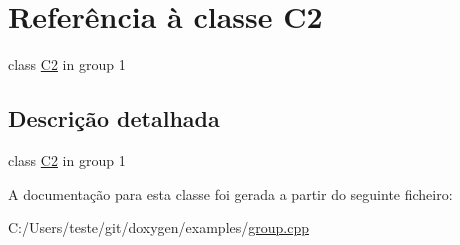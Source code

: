 \hypertarget{class_c2}{\section{Referência à classe C2}
\label{class_c2}
}


class \hyperlink{class_c2}{C2} in group 1  




\subsection{Descrição detalhada}
class \hyperlink{class_c2}{C2} in group 1 

A documentação para esta classe foi gerada a partir do seguinte ficheiro\-:\begin{DoxyCompactItemize}
\item 
C\-:/\-Users/teste/git/doxygen/examples/\hyperlink{group_8cpp}{group.\-cpp}\end{DoxyCompactItemize}
